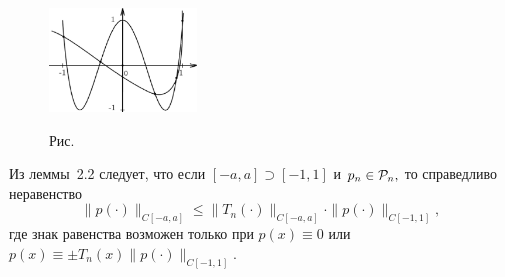  \bigskip
\begin{figure}[ht]
\begin{center}
\includegraphics[width=0.35\textwidth]{pict/pict02-4.eps}
\end{center}
 \bigskip
 \label{r2-4}

 \centerline{Рис.~\theris}
 \bigskip
\end{figure}




\begin{Remark}
Из леммы~2.2 следует, что если $[-a,a] \supset [-1,1]$
 и $p_n \in \mathcal{P}_n,$ то справедливо неравенство
\[
  \|p(\cdot )\|_{C[-a,a]} \le \|T_n(\cdot )\|_{C[-a,a]}\cdot \|p(\cdot )\|_{C[-1,1]},
\]
{где знак равенства возможен только при $p(x)\equiv 0$ или $p(x)\equiv\pm T_n(x)
\|p(\cdot )\|_{C[-1,1]}$.}
\end{Remark}
